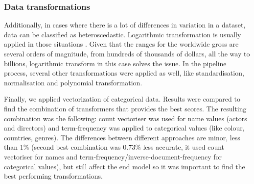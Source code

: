 \subsubsection{Data transformations}
\label{sec:data_trans}
Additionally, in cases where there is a lot of differences in variation in a dataset, data can be classified as heteroscedastic. Logarithmic transformation is usually applied in those situations \cite{kvalheim1994preprocessing}. Given that the ranges for the worldwide gross are several orders of magnitude, from hundreds of thousands of dollars, all the way to billions, logarithmic transform in this case solves the issue. In the pipeline process, several other transformations were applied as well, like standardisation, normalisation and polynomial transformation. 

Finally, we applied vectorization of categorical data. Results were compared to find the combination of transformers that provides the best scores. The resulting combination was the following: count vectoriser was used for name values (actors and directors) and term-frequency was applied to categorical values (like colour, countries, genres). The differences between different approaches are minor, less than 1\% (second best combination was 0.73\% less accurate, it used count vectoriser for names and term-frequency/inverse-document-frequency for categorical values), but still affect the end model so it was important to find the best performing transformations.


